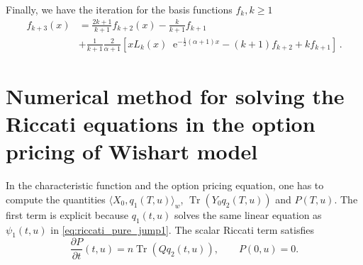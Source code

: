 \documentclass[10pt,a4paper,reqno]{amsart}
\newcommand*\E{\mathop{}\!\mathrm{e}}
\DeclareMathOperator{\tr}{Tr}
\numberwithin{equation}{section}
\theoremstyle{plain}
\theoremstyle{definition}
\theoremstyle{example}
\begin{document}
Finally, we have the iteration for the basis functions $f_k, k\geq 1$
\begin{equation*}
\begin{aligned}
    f_{k+3}(x) &= \frac{2k+1}{k+1}f_{k+2}(x) - \frac{k}{k+1}f_{k+1} \\
    &+ \frac{1}{k+1}\frac{2}{\alpha+1}\left[xL_{k}(x)\E^{-\frac{1}{2}(\alpha+1)x} - (k+1)f_{k+2} + kf_{k+1}\right]\,.
\end{aligned}
\end{equation*}


\section{Numerical method for solving the Riccati equations in the option pricing of Wishart model}\label{sec:riccat_ws}
In the characteristic function and the option pricing equation, one has to compute the quantities
$\langle X_0, q_1(T, u)\rangle_w$, $\tr(Y_0q_2(T, u))$ and $P(T, u)$.
The first term is explicit because $q_1(t, u)$ solves the same linear equation as $\psi_1(t,u)$ in \eqref{eq:riccati_pure_jump1}. The scalar Riccati term satisfies
\begin{equation*}
    \frac{\partial P}{\partial t}(t, u) = n\tr(Qq_2(t, u)), \qquad P(0,u)=0.
\end{equation*}
\end{document}

